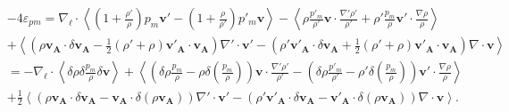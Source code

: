    \begin{equation}
\begin{align}
\label{eq:turb_ref_pm}&-4\varepsilon_{pm}=  \nabla_{\boldsymbol{\ell}} \cdot \left<\left(1+\frac{\rho'}{\rho}\right) p_m \boldsymbol{v'} - \left(1+\frac{\rho}{\rho'}\right)p'_m\boldsymbol{v} \right> - \left<\rho \frac{p'_m}{\rho'} \boldsymbol{v} \cdot \frac{\nabla'\rho'}{\rho'} + \rho' \frac{p_m}{\rho} \boldsymbol{v'} \cdot \frac{\nabla\rho}{\rho}\right> \\
    &+\left<\left(\rho \boldsymbol{v_A} \cdot \delta \boldsymbol{v_A} - \frac{1}{2}\left(\rho' + \rho\right) \boldsymbol{v'_A} \cdot \boldsymbol{v_A}\right)\nabla' \cdot \boldsymbol{v'} - \left(\rho' \boldsymbol{v'_A} \cdot \delta \boldsymbol{v_A} + \frac{1}{2}\left(\rho' + \rho\right) \boldsymbol{v'_A} \cdot \boldsymbol{v_A}\right)\nabla \cdot \boldsymbol{v}\right>\\
    &=- \nabla_{\boldsymbol{\ell}} \cdot \left<\delta \rho  \delta \frac{p_m}{\rho} \delta \boldsymbol{v} \right> + \left<\left(\delta \rho \frac{p_m}{\rho} - \rho \delta \left(\frac{p_m}{\rho}\right)\right)\boldsymbol{v} \cdot \frac{\nabla' \rho'}{\rho'} - \left(\delta \rho \frac{p'_m}{\rho'} - \rho' \delta \left(\frac{p_m}{\rho}\right)\right)\boldsymbol{v'} \cdot \frac{\nabla \rho}{\rho}\right>\\
    &+\frac{1}{2}\left<\left(\rho \boldsymbol{v_A} \cdot \delta \boldsymbol{v_A} - \boldsymbol{v_A} \cdot \delta \left(\rho \boldsymbol{v_A}\right)\right)\nabla' \cdot \boldsymbol{v'} - \left(\rho' \boldsymbol{v'_A} \cdot \delta \boldsymbol{v_A} - \boldsymbol{v'_A} \cdot \delta \left(\rho \boldsymbol{v_A}\right)\right)\nabla \cdot \boldsymbol{v}\right>.
    \end{align}
\end{equation}

